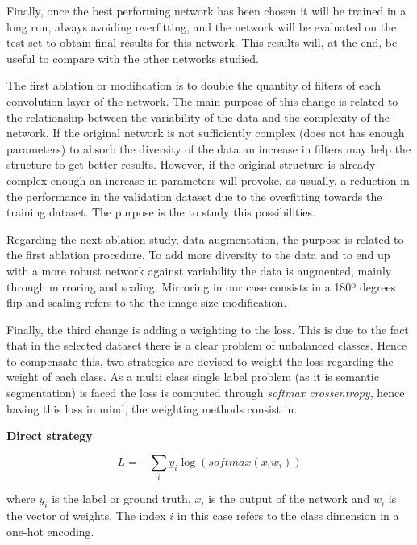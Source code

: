 \documentclass[12pt,a4paper]{article}
\begin{document}
Finally, once the best performing network has been chosen it will be trained in a long run, always avoiding overfitting, and the network will be evaluated on the test set to obtain final results for this network. This results will, at the end, be useful to compare with the other networks studied.\newline

The first ablation or modification is to double the quantity of filters of each convolution layer of the network. The main purpose of this change is related to the relationship between the variability of the data and the complexity of the network. If the original network is not sufficiently complex (does not has enough parameters) to absorb the diversity of the data an increase in filters may help the structure to get  better results. However, if the original structure is already complex enough an increase in parameters will provoke, as usually, a reduction in the performance in the validation dataset due to the overfitting towards the training dataset. The purpose is the to study this possibilities.\newline

Regarding the next ablation study, data augmentation, the purpose is related to the first ablation procedure. To add more diversity to the data and to end up with a more robust network against variability the data is augmented, mainly through mirroring and scaling. Mirroring in our case consists in a 180º degrees flip and scaling refers to the the image size modification. \newline

Finally, the third change is adding a weighting to the loss. This is due to the fact that in the selected dataset there is a clear problem of unbalanced classes. Hence to compensate this, two strategies are devised to weight the loss regarding the weight of each class. As a multi class single label problem (as it is semantic segmentation) is faced the loss is computed through \textit{softmax crossentropy}, hence having this loss in mind, the weighting methods consist in:\newline

\textbf{Direct strategy}\newline

\begin{equation*}
L = -\sum_{i} y_{i}\log(softmax(x_{i}w_{i}))
\end{equation*}

where $y_{i}$ is the label or ground truth, $x_{i}$ is the output of the network and $w_{i}$ is the vector of weights. The index $i$ in this case refers to the class dimension in a one-hot encoding.\newline
\end{document}
